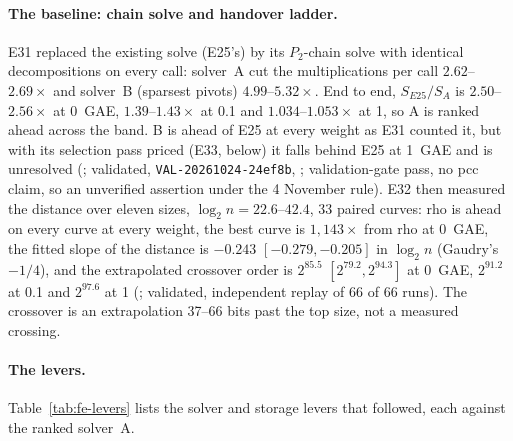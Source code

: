 \paragraph{The baseline: chain solve and handover ladder.} E31 replaced the
existing solve (E25's) by its $P_2$-chain solve with identical decompositions
on every call: solver~A cut the multiplications per call $2.62$--$2.69\times$
and solver~B (sparsest pivots) $4.99$--$5.32\times$. End to end, $S_{E25}/S_A$
is $2.50$--$2.56\times$ at 0~GAE, $1.39$--$1.43\times$ at 0.1 and
$1.034$--$1.053\times$ at 1, so A is ranked ahead across the band. B is ahead of E25 at every weight
as E31 counted it, but with its selection pass priced (E33, below) it falls
behind E25 at 1~GAE and is unresolved
(; validated, \texttt{VAL-20261024-24ef8b},
; validation-gate
pass, no pcc claim, so an unverified assertion under the 4 November rule). E32 then measured
the distance over eleven sizes, $\log_2n=22.6$--$42.4$, 33 paired curves:
rho is ahead on every curve at every weight, the best curve is $1{,}143\times$
from rho at 0~GAE, the fitted slope of the distance is $-0.243$
$[-0.279,-0.205]$ in $\log_2n$ (Gaudry's $-1/4$), and the extrapolated
crossover order is $2^{85.5}$ $[2^{79.2},2^{94.3}]$ at 0~GAE, $2^{91.2}$ at 0.1
and $2^{97.6}$ at 1 (; validated,
independent replay of 66 of 66 runs). The crossover is an extrapolation 37--66
bits past the top size, not a measured crossing.

\paragraph{The levers.} Table~\ref{tab:fe-levers} lists the solver and
storage levers that followed, each against the ranked solver~A.

